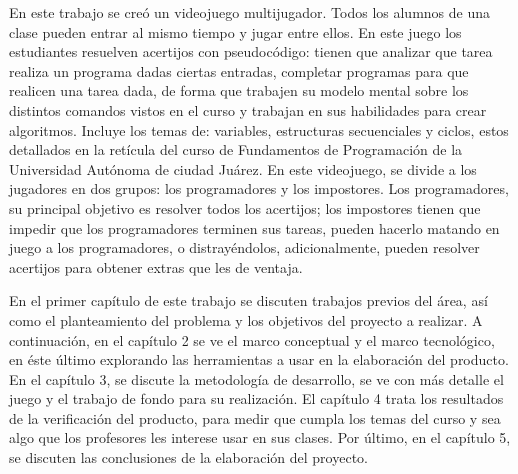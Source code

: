 En este trabajo se creó un videojuego multijugador. Todos los alumnos de una clase pueden entrar al mismo tiempo y jugar entre ellos. En este juego los estudiantes resuelven acertijos con pseudocódigo: tienen que analizar que tarea realiza un programa dadas ciertas entradas, completar programas para que realicen una tarea dada, de forma que trabajen su modelo mental sobre los distintos comandos vistos en el curso y trabajan en sus habilidades para crear algoritmos. Incluye los temas de: variables, estructuras secuenciales y ciclos, estos detallados en la retícula del curso de Fundamentos de Programación de la Universidad Autónoma de ciudad Juárez. En este videojuego, se divide a los jugadores en dos grupos: los programadores y los impostores. Los programadores, su principal objetivo es resolver todos los acertijos; los impostores tienen que impedir que los programadores terminen sus tareas, pueden hacerlo matando en juego a los programadores, o distrayéndolos, adicionalmente, pueden resolver acertijos para obtener extras que les de ventaja. 

En el primer capítulo de este trabajo se discuten trabajos previos del área, así como el planteamiento del problema y los objetivos del proyecto a realizar. A continuación, en el capítulo 2 se ve el marco conceptual y el marco tecnológico, en éste último explorando las herramientas a usar en la elaboración del producto. En el capítulo 3, se discute la metodología de desarrollo, se ve con más detalle el juego y el trabajo de fondo para su realización. El capítulo 4 trata los resultados de la verificación del producto, para medir que cumpla los temas del curso y sea algo que los profesores les interese usar en sus clases. Por último, en el capítulo 5, se discuten las conclusiones de la elaboración del proyecto.
